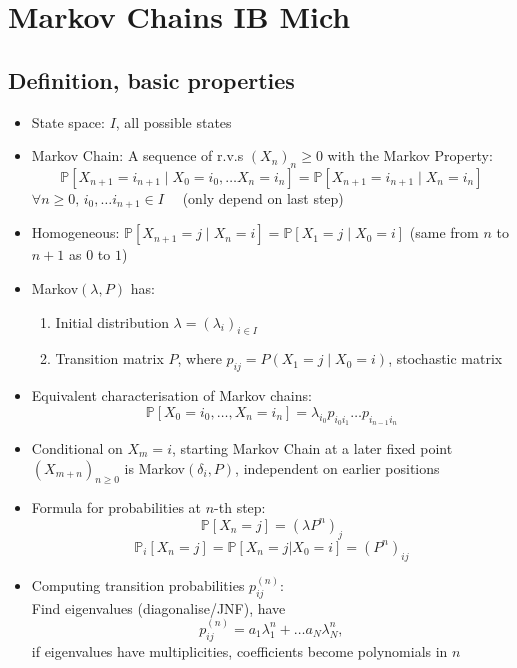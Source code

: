 


\section*{Markov Chains \hfill IB Mich}
\subsection*{Definition, basic properties}
\begin{itemize}
    \item State space: $I$, all possible states
    \item Markov Chain: A sequence of r.v.s $(X_n)_n\geq 0$ with the Markov Property:
          \[\mathbb{P}[X_{n+1}=i_{n+1} \mid X_0=i_0,\dots X_n=i_n] = \mathbb{P}[X_{n+1}=i_{n+1} \mid X_n=i_n]
          \] $\forall n\geq 0 , \, i_0,\dots i_{n+1} \in I \quad $ (only depend on last step)
    \item Homogeneous:  $\mathbb{P}[X_{n+1}=j \mid X_n=i] =  \mathbb{P}[X_{1}=j \mid X_0=i]$ (same from $n$ to $n+1$ as $0$ to $1$)
    \item Markov$(\lambda,P)$ has:
          \begin{enumerate}
              \item Initial distribution $\lambda = (\lambda_i)_{i \in I}$
              \item Transition matrix $P$, where $p_{ij}=P(X_{1}=j \mid X_0=i)$, stochastic matrix
          \end{enumerate}
    \item Equivalent characterisation of Markov chains: \[\mathbb{P}[X_0=i_0,\dots,X_n=i_n] = \lambda_{i_0} p_{i_0 i_1} \dots p_{i_{n-1} i_n}\]
    \item Conditional on $X_m=i$, starting Markov Chain at a later fixed point $(X_{m+n})_{n\geq 0}$ is Markov$(\delta_i,P)$, independent on earlier positions
    \item Formula for probabilities at $n$-th step:
          \[\mathbb{P}[X_n=j]=(\lambda P^n)_j\]
          \[\mathbb{P}_i[X_n=j] = \mathbb{P}[X_n=j|X_0=i]=(P^n)_{ij} \]
    \item Computing transition probabilities $p^{(n)}_{ij}$: \\Find eigenvalues (diagonalise/JNF), have \[p^{(n)}_{ij}=a_1\lambda_1^n + \dots a_N\lambda_N^n,\] if eigenvalues have multiplicities, coefficients become polynomials in $n$

\end{itemize}

